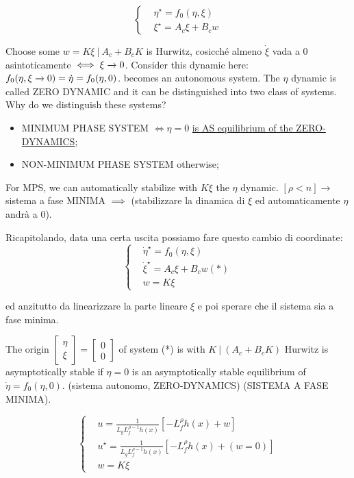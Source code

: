 \[
	\left\{
	\begin{aligned}
	&\eta^\star = f_0(\eta, \xi) \\
	&\xi^\star = A_c\xi + B_cw
	\end{aligned}
	\right.
\]

Choose some $w=K\xi\ |\ A_c+B_cK$ is Hurwitz, cosicché almeno $\dot{\xi}$ vada a 0 asintoticamente $\iff \xi \tendsto{} 0$. Consider this dynamic here: $f_0(\eta, \xi \tendsto{} 0) = \dot{\eta} = f_0(\eta,0)$. becomes an autonomous system. The $\eta$ dynamic is called ZERO DYNAMIC and it can be distinguished into two class of systems. Why do we distinguish these systems?

\begin{itemize}
\item MINIMUM PHASE SYSTEM $\iff \eta = 0$ \underline{is AS equilibrium of the ZERO-DYNAMICS};
\item NON-MINIMUM PHASE SYSTEM otherwise;
\end{itemize}

For MPS, we can automatically stabilize with $K\xi$ the $\eta$ dynamic.
$[\rho < n] \rightarrow$ sistema a fase MINIMA $\implies$ (stabilizzare la dinamica di $\xi$ ed automaticamente $\eta$ andrà a 0).

Ricapitolando, data una certa uscita possiamo fare questo cambio di coordinate:
\[
	\left\{
	\begin{aligned}
	&\dot{\eta}^\star = f_0(\eta, \xi) \\
	&\dot{\xi}^\star = A_c\xi + B_cw (*) \\
	&w = K\xi
	\end{aligned}
	\right.
\]

ed anzitutto da linearizzare la parte lineare $\xi$ e poi sperare che il sistema sia a fase minima.

\begin{thrm}
The origin $\begin{bmatrix}\eta \\ \xi\end{bmatrix}=\begin{bmatrix}0\\0\end{bmatrix}$ of system (*) is with $K\ |\ (A_c+B_cK)$ Hurwitz is asymptotically stable if $\eta = 0$ is an asymptotically stable equilibrium of $\dot{\eta} = f_0(\eta,0)$. (sistema autonomo, ZERO-DYNAMICS) (SISTEMA A FASE MINIMA).
\end{thrm}

\[
	\left\{
	\begin{aligned}
	&u = \frac{1}{L_gL^{\rho-1}_fh(x)}[-L^\rho_fh(x) + w] \\
	&u^\star = \frac{1}{L_gL^{\rho-1}_fh(x)}[-L^\rho_fh(x) + (w=0)] \\
	&w = K\xi
	\end{aligned}
	\right.
\]

